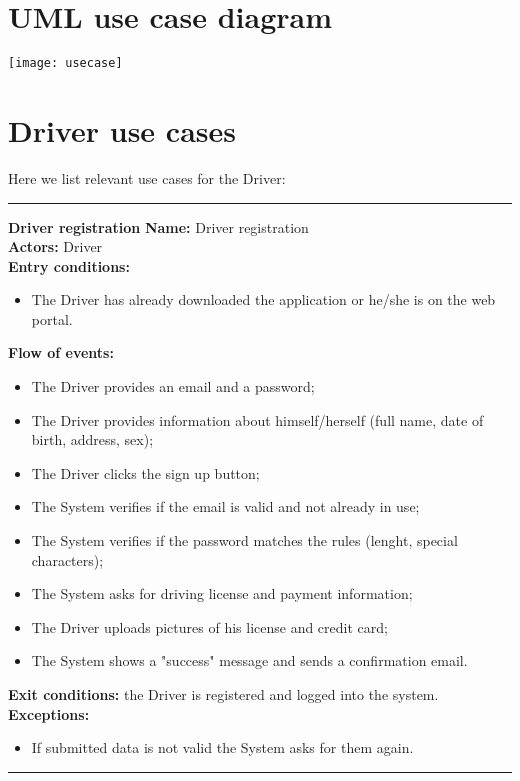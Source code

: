 \section{UML use case diagram}
\texttt{[image: usecase]}
\section{Driver use cases}
Here we list relevant use cases for the Driver:\\
\begin{center}
\noindent\rule{8cm}{1.0pt}
\end{center}

\textbf{\large Driver registration}
\bigbreak
\textbf{Name:} Driver registration \\
\textbf{Actors:} Driver \\
\textbf{Entry conditions:} 
\begin{itemize}
\item The Driver has already downloaded the application or he/she is on the web portal.
\end{itemize}
\textbf{Flow of events:} 
\begin{itemize}
\item The Driver provides an email and a password;
\item The Driver provides information about himself/herself (full name, date of birth, address, sex);
\item The Driver clicks the sign up button;
\item The System verifies if the email is valid and not already in use;
\item The System verifies if the password matches the rules (lenght, special characters);
\item The System asks for driving license and payment information;
\item The Driver uploads pictures of his license and credit card;
\item The System shows a "success" message and sends a confirmation email.
\end{itemize}
\textbf{Exit conditions:} the Driver is registered and logged into the system.\\
\textbf{Exceptions:} 
\begin{itemize}
\item If submitted data is not valid the System asks for them again.
\end{itemize}

\begin{center}
\noindent\rule{8cm}{1.0pt}
\end{center}


